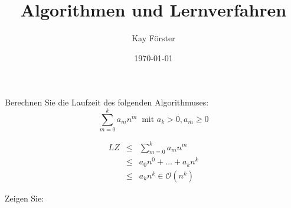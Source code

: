 \documentclass[a4paper,11pt]{exam}
\title{Algorithmen und Lernverfahren}
\author{Kay Förster}
\date{\today}
\begin{document}
\maketitle

\begin{questions}
	\question Berechnen Sie die Laufzeit des folgenden Algorithmuses:
		\[\sum_{m=0}^{k} a_m n^m \;\;\textrm{mit } a_k > 0, a_m \geq 0\]
	\begin{solution}
		\begin{eqnarray*}
			LZ	&\leq& \sum_{m=0}^{k} a_m n^m \\
				&\leq& a_0 n^0 + \dots + a_k n^k \\
				&\leq& a_k n^k \in \mathcal{O}(n^k)
		\end{eqnarray*}
	\end{solution}


	\question Zeigen Sie:
	\begin{solution}
	\end{solution}



\end{questions}
\end{document}

